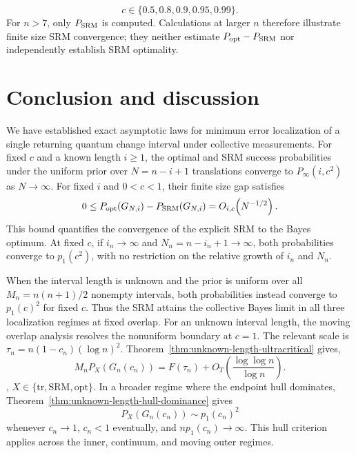 \[
c\in\{0.5,0.8,0.9,0.95,0.99\}.
\]
For \(n>7\), only \(P_{\rm SRM}\) is computed. Calculations at larger \(n\)
therefore illustrate finite size SRM convergence; they neither estimate
\(P_{\rm opt}-P_{\rm SRM}\) nor independently establish SRM optimality.






\FloatBarrier

\section{Conclusion and discussion}
\label{sec:conclusion}

We have established exact asymptotic laws for minimum error localization of a
single returning quantum change interval under collective
measurements. For fixed \(c\) and a known length \(i\geq1\), the optimal
and SRM success probabilities under the uniform prior over
\(N=n-i+1\) translations converge to \(P_\infty(i,c^2)\) as
\(N\to\infty\). For fixed \(i\) and \(0<c<1\), their finite size gap
satisfies
\[
0\leq
P_{\rm opt}(G_{N,i})-P_{\rm SRM}(G_{N,i})
=
O_{i,c}\!\left(N^{-1/2}\right).
\]
This bound quantifies the convergence of the explicit SRM to the Bayes
optimum. At fixed \(c\), if \(i_n\to\infty\) and
\(N_n=n-i_n+1\to\infty\), both probabilities converge to \(p_1(c^2)\),
with no restriction on the relative growth of \(i_n\) and \(N_n\).

When the interval length is unknown and the prior is uniform over all
\(M_n=n(n+1)/2\) nonempty intervals, both probabilities instead converge to
\(p_1(c)^2\) for fixed \(c\). Thus the SRM attains the collective Bayes
limit in all three localization regimes at fixed overlap. For an unknown interval length, the moving overlap analysis resolves the
nonuniform boundary at \(c=1\). The relevant scale is
\(\tau_n=n(1-c_n)(\log n)^2\). Theorem~\ref{thm:unknown-length-ultracritical} gives,
\[
M_nP_X(G_n(c_n))
=
F(\tau_n)
+
O_T\!\left(\frac{\log\log n}{\log n}\right).
\]
, \(X\in\{\mathrm{tr},\mathrm{SRM},\mathrm{opt}\}\). In a broader regime where the endpoint
hull dominates, Theorem~\ref{thm:unknown-length-hull-dominance} gives
\[
P_X(G_n(c_n))
\sim
p_1(c_n)^2
\]
whenever \(c_n\to1\), \(c_n<1\) eventually, and
\(n p_1(c_n)\to\infty\). This hull criterion applies across the inner,
continuum, and moving outer regimes.

